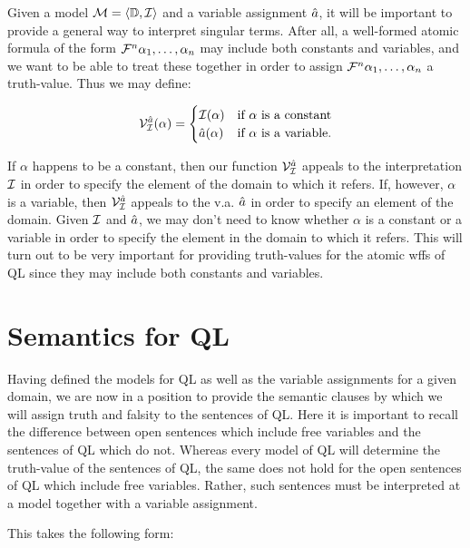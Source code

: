 Given a model $\mathcal{M}=\langle\mathbb{D},\mathcal{I}\rangle$ and a variable assignment $\hat{a}$, it will be important to provide a general way to interpret singular terms.
After all, a well-formed atomic formula of the form $\mathcal{F}^n\alpha_1,\ldots,\alpha_n$ may include both constants and variables, and we want to be able to treat these together in order to assign $\mathcal{F}^n\alpha_1,\ldots,\alpha_n$ a truth-value. 
Thus we may define:

\begin{align*}
  \mathcal{V}_{\mathcal{I}}^{\hat{a}}{(\alpha)}=
    \begin{cases}
      \mathcal{I}(\alpha) & \text{if } \alpha \text{ is a constant} \\
      \hat{a}(\alpha) & \text{if } \alpha \text{ is a variable.}
    \end{cases}
\end{align*}

If $\alpha$ happens to be a constant, then our function $\mathcal{V}_{\mathcal{I}}^{\hat{a}}{}$ appeals to the interpretation $\mathcal{I}$ in order to specify the element of the domain to which it refers. 
If, however, $\alpha$ is a variable, then $\mathcal{V}_{\mathcal{I}}^{\hat{a}}{}$ appeals to the v.a. $\hat{a}$ in order to specify an element of the domain.
Given $\mathcal{I}$ and $\hat{a}$, we may don't need to know whether $\alpha$ is a constant or a variable in order to specify the element in the domain to which it refers.
This will turn out to be very important for providing truth-values for the atomic wffs of QL since they may include both constants and variables.





\section{Semantics for QL}

Having defined the models for QL as well as the variable assignments for a given domain, we are now in a position to provide the semantic clauses by which we will assign truth and falsity to the sentences of QL.
Here it is important to recall the difference between open sentences which include free variables and the sentences of QL which do not.
Whereas every model of QL will determine the truth-value of the sentences of QL, the same does not hold for the open sentences of QL which include free variables.
Rather, such sentences must be interpreted at a model together with a variable assignment.


This takes the following form:

